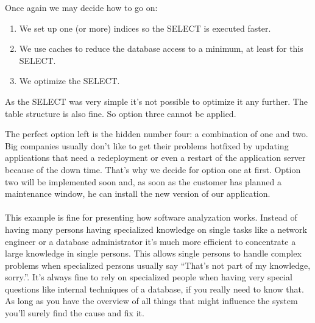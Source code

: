 Once again we may decide how to go on:
\begin{enumerate}
\item We set up one (or more) indices so the SELECT is executed faster.
\item We use caches to reduce the database access to a minimum, at least for this SELECT.
\item We optimize the SELECT.
\end{enumerate}

As the SELECT was very simple it's not possible to optimize it any further.
The table structure is also fine.
So option three cannot be applied.

The perfect option left is the hidden number four: a combination of one and two.
Big companies usually don't like to get their problems hotfixed by updating applications that need a redeployment or even a restart of the application server because of the down time.
That's why we decide for option one at first.
Option two will be implemented soon and, as soon as the customer has planned a maintenance window, he can install the new version of our application.
\\\\
This example is fine for presenting how software analyzation works.
Instead of having many persons having specialized knowledge on single tasks like a network engineer or a database administrator it's much more efficient to concentrate a large knowledge in single persons.
This allows single persons to handle complex problems when specialized persons usually say ``That's not part of my knowledge, sorry.''.
It's always fine to rely on specialized people when having very special questions like internal techniques of a database, if you really need to know that.
As long as you have the overview of all things that might influence the system you'll surely find the cause and fix it.